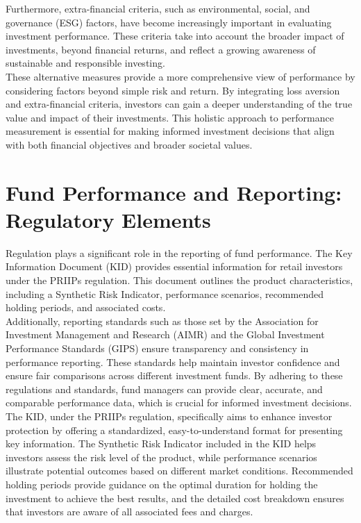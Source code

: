 \documentclass[a4paper,10pt]{article}
\begin{document}
\noindent Furthermore, extra-financial criteria, such as environmental, social, and governance (ESG) factors, have become increasingly important in evaluating investment performance. These criteria take into account the broader impact of investments, beyond financial returns, and reflect a growing awareness of sustainable and responsible investing. \\

\noindent These alternative measures provide a more comprehensive view of performance by considering factors beyond simple risk and return. By integrating loss aversion and extra-financial criteria, investors can gain a deeper understanding of the true value and impact of their investments. This holistic approach to performance measurement is essential for making informed investment decisions that align with both financial objectives and broader societal values. \\

\section*{Fund Performance and Reporting: Regulatory Elements}

\noindent Regulation plays a significant role in the reporting of fund performance. The Key Information Document (KID) provides essential information for retail investors under the PRIIPs regulation. This document outlines the product characteristics, including a Synthetic Risk Indicator, performance scenarios, recommended holding periods, and associated costs. \\

\noindent Additionally, reporting standards such as those set by the Association for Investment Management and Research (AIMR) and the Global Investment Performance Standards (GIPS) ensure transparency and consistency in performance reporting. These standards help maintain investor confidence and ensure fair comparisons across different investment funds. By adhering to these regulations and standards, fund managers can provide clear, accurate, and comparable performance data, which is crucial for informed investment decisions. \\

\noindent The KID, under the PRIIPs regulation, specifically aims to enhance investor protection by offering a standardized, easy-to-understand format for presenting key information. The Synthetic Risk Indicator included in the KID helps investors assess the risk level of the product, while performance scenarios illustrate potential outcomes based on different market conditions. Recommended holding periods provide guidance on the optimal duration for holding the investment to achieve the best results, and the detailed cost breakdown ensures that investors are aware of all associated fees and charges. \\
\end{document}
